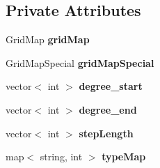 \subsection*{Private Attributes}
\begin{DoxyCompactItemize}
\item 
\hypertarget{classRotamer_a76ee1c806449ead94fa3801e46e21e04}{Grid\-Map {\bfseries grid\-Map}}\label{classRotamer_a76ee1c806449ead94fa3801e46e21e04}

\item 
\hypertarget{classRotamer_aafeec4267c9e5574fff40c81510cc8d6}{Grid\-Map\-Special {\bfseries grid\-Map\-Special}}\label{classRotamer_aafeec4267c9e5574fff40c81510cc8d6}

\item 
\hypertarget{classRotamer_ac4070f518eddf3d53c778f0de4e588bf}{vector$<$ int $>$ {\bfseries degree\-\_\-start}}\label{classRotamer_ac4070f518eddf3d53c778f0de4e588bf}

\item 
\hypertarget{classRotamer_a4e9a547df84cb5b14d2428aedf14fbb1}{vector$<$ int $>$ {\bfseries degree\-\_\-end}}\label{classRotamer_a4e9a547df84cb5b14d2428aedf14fbb1}

\item 
\hypertarget{classRotamer_af4c4d542df7ea52375a4dc1fd25f4425}{vector$<$ int $>$ {\bfseries step\-Length}}\label{classRotamer_af4c4d542df7ea52375a4dc1fd25f4425}

\item 
\hypertarget{classRotamer_a2a3f5f9eb1cb68fbe5a76c8b409b386d}{map$<$ string, int $>$ {\bfseries type\-Map}}\label{classRotamer_a2a3f5f9eb1cb68fbe5a76c8b409b386d}

\end{DoxyCompactItemize}
